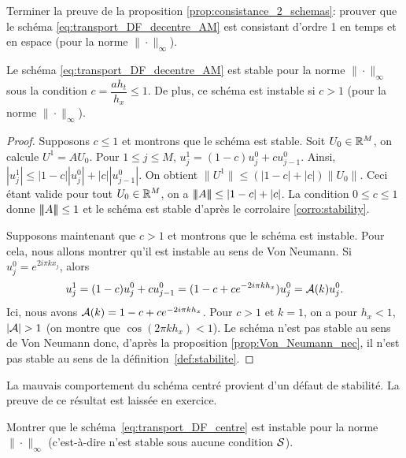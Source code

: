 \documentclass[12pt,a4paper,twoside]{article}
\begin{document}
\begin{exercise}
  \label{exo:consistance_trans_AM}
  Terminer la preuve de la proposition \ref{prop:consistance_2_schemas}:
  prouver que le sch\'ema \eqref{eq:transport_DF_decentre_AM} est consistant
  d'ordre 1 en temps et en espace (pour la norme $\| \cdot \|_{\infty}$). 
\end{exercise}


\begin{proposition}
  \label{prop:stabilite_transport_AM}
  Le sch\'ema \eqref{eq:transport_DF_decentre_AM} est stable pour la norme $\| \cdot \|_{\infty}$
  sous la condition $c = \dfrac{a h_t}{h_x} \leq 1$.
  De plus, ce sch\'ema est instable si $c > 1$ (pour la norme $\| \cdot \|_{\infty}$).
\end{proposition}
\begin{proof}
  Supposons $c \leq 1$ et montrons que le sch\'ema est stable.
  Soit $U_0 \in \mathbb{R}^M$, on calcule $U^1 = A U_0$.
  Pour $1 \leq j \leq M$, 
  $u_j^1 = (1-c) u_j^0 + c u_{j-1}^0$.
  Ainsi, $|u_j^1| \leq |1-c| | u_j^0 | + | c | | u_{j-1}^0 |$.
  On obtient $\| U^1 \| \leq (|1-c| + |c|) \| U_0 \|$.
  Ceci \'etant valide pour tout $U_0 \in \mathbb{R}^M$, on a $|\!|\!| A |\!|\!| \leq |1-c| + |c|$.
  La condition $0 \leq c \leq 1$ donne $|\!|\!| A |\!|\!| \leq 1$ et le sch\'ema est stable 
  d'apr\`es le corrolaire \ref{corro:stability}.

  Supposons maintenant que $c > 1$ et montrons que le sch\'ema est instable.
  Pour cela, nous allons montrer qu'il est instable au sens de Von Neumann.
  Si $u_j^0 = e^{2i\pi k x_j}$, alors
  \[
    u_j^{1} = (1-c) u_j^0 + c u_{j-1}^0 = (1 - c + c e^{-2i\pi k h_x}) u_j^0 
    = \mathcal{A}(k) u_j^0.
  \]
  Ici, nous avons $\mathcal{A}(k) = 1 - c + c e^{-2i\pi k h_x}$.
  Pour $c > 1$ et $k=1$, on a pour $h_x<1$,
  $| \mathcal{A} | > 1$ (on montre que $\cos(2\pi k h_x) < 1$). 
  Le sch\'ema n'est pas stable au sens 
  de Von Neumann donc, d'apr\`es la proposition \ref{prop:Von_Neumann_nec},
  il n'est pas stable au sens de la d\'efinition~\ref{def:stabilite}.
\end{proof}

La mauvais comportement du sch\'ema centr\'e provient d'un d\'efaut
de stabilit\'e. La preuve de ce r\'esultat est laiss\'ee en exercice.
\begin{exercise}
  Montrer que le sch\'ema~\eqref{eq:transport_DF_centre} est instable
  pour la norme $\| \cdot \|_{\infty}$
  (c'est-\`a-dire n'est stable sous aucune condition $\mathcal{S}$).
\end{exercise}
\end{document}
